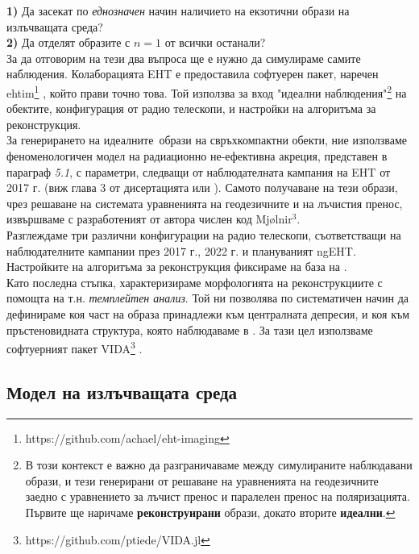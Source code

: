 \documentclass[12pt]{article}
\numberwithin{equation}{section}
\numberwithin{figure}{section}
\begin{document}
	\textbf{1)} Да засекат по \emph{еднозначен} начин наличието на екзотични образи на излъчващата среда?\\
	
	\textbf{2)} Да отделят образите с $n = 1$ от всички останали?\\
	
	За да отговорим на тези два въпроса ще е нужно да симулираме самите наблюдения. Колаборацията EHT е предоставила софтуерен пакет, наречен ehtim\footnote{https://github.com/achael/eht-imaging} \cite{EHTIM}, който прави точно това. Той използва за вход "идеални наблюдения"\footnote{В този контекст е важно да разграничаваме между симулираните наблюдавани образи, и тези генерирани от решаване на уравненията на геодезичните заедно с уравнението за лъчист пренос и паралелен пренос на поляризацията. Първите ще наричаме \textbf{реконструирани} образи, докато вторите \textbf{идеални}.} на обектите, конфигурация от радио телескопи, и настройки на алгоритъма за реконструкция. \\
	
	За генерирането на идеалните$\,$ образи на свръхкомпактни обекти, ние използваме феноменологичен модел на радиационно не-ефективна акреция, представен в параграф \emph{5.1}, с параметри, следващи от наблюдателната кампания на EHT от 2017 г. (виж глава 3 от дисертацията или \cite{EHT_M87_V}\cite{EHT_M87_VIII}). Самото получаване на тези образи, чрез решаване на системата уравненията на геодезичните и на лъчистия пренос, извършваме с разработеният от автора числен код Mjølnir$^3$. \\
	
	\noindent Разглеждаме три различни конфигурации на радио телескопи, съответстващи на наблюдателните кампании през 2017 г., 2022 г. и плануваният ngEHT.\\
	
	\noindent Настройките на алгоритъма за реконструкция фиксираме на база на \cite{EHTIM}.\\
	
	\noindent Като последна стъпка, характеризираме морфологията на реконструкциите с помощта на т.н. \emph{темплейтен анализ}. Той ни позволява по систематичен начин да дефинираме коя част на образа принадлежи към централната депресия, и коя към пръстеновидната структура, която наблюдаваме в \cite{EHT_M87_I}\cite{EHT_SGR_I}. За тази цел използваме софтуерният пакет VIDA\footnote{https://github.com/ptiede/VIDA.jl} \cite{VIDA}.
	
	\newpage
	
	\subsection{Модел на излъчващата среда}
	
\end{document}
